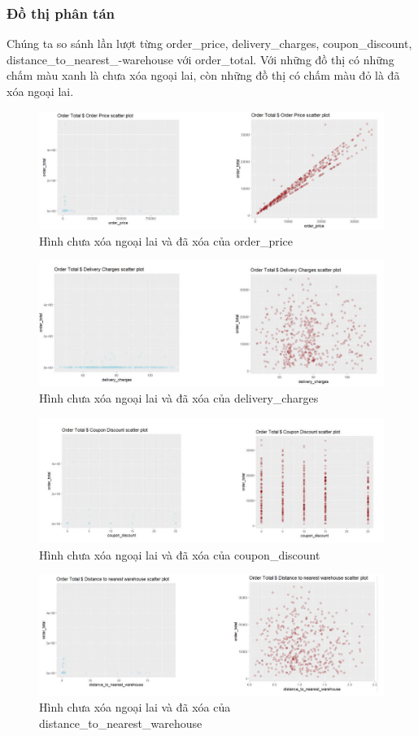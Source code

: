 \subsubsection{Đồ thị phân tán}
Chúng ta so sánh  lần lượt từng order\_price, delivery\_charges, coupon\_discount, distance\_to\_nearest\_-warehouse với order\_total. Với những đồ thị có những chấm màu xanh là chưa xóa ngoại lai, còn những đồ thị có chấm màu đỏ là đã xóa ngoại lai.
\begin{figure}[!htbp]
    \centering
    \includegraphics[width=0.9\linewidth]{graphics/bang9.jpg}
    \caption{Hình chưa xóa ngoại lai và đã xóa của order\_price}
    \label{a}
\end{figure}
\begin{figure}[!htbp]
    \centering
    \includegraphics[width=0.8\linewidth]{graphics/bang10.jpg}
    \caption{Hình chưa xóa ngoại lai và đã xóa của delivery\_charges}
    \label{b}
\end{figure}
\begin{figure}[!htbp]
    \centering
    \includegraphics[width=0.8\linewidth]{graphics/bang11.jpg}
    \caption{Hình chưa xóa ngoại lai và đã xóa của coupon\_discount}
    \label{c}
\end{figure}
\begin{figure}[!htbp]
    \centering
    \includegraphics[width=0.8\linewidth]{graphics/bang12.jpg}
    \caption{Hình chưa xóa ngoại lai và đã xóa của distance\_to\_nearest\_warehouse}
    \label{d}
\end{figure}

